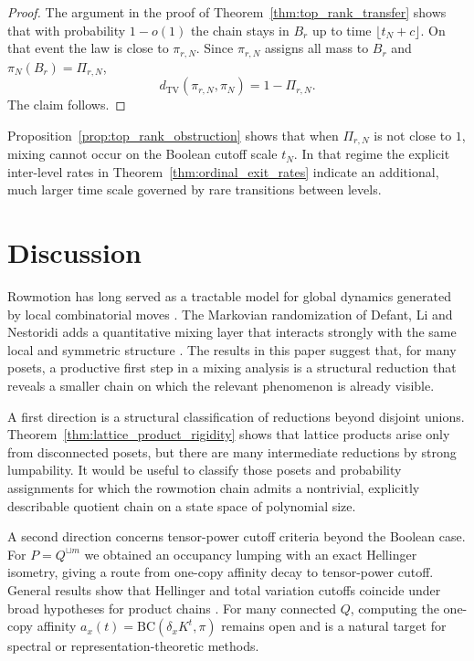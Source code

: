 \documentclass[final,3p,times]{elsarticle}
\theoremstyle{definition}
\newcommand{\TV}{d_{\mathrm{TV}}}
\newcommand{\BC}{\mathrm{BC}}
\begin{document}
\begin{proof}
The argument in the proof of Theorem~\ref{thm:top_rank_transfer} shows that with probability $1-o(1)$ the chain stays in $B_r$ up to time $\lfloor t_N+c\rfloor$.
On that event the law is close to $\pi_{r,N}$.
Since $\pi_{r,N}$ assigns all mass to $B_r$ and $\pi_N(B_r)=\Pi_{r,N}$,
\[
\TV(\pi_{r,N},\pi_N)=1-\Pi_{r,N}.
\]
The claim follows.
\end{proof}

Proposition~\ref{prop:top_rank_obstruction} shows that when $\Pi_{r,N}$ is not close to $1$, mixing cannot occur on the Boolean cutoff scale $t_N$.
In that regime the explicit inter-level rates in Theorem~\ref{thm:ordinal_exit_rates} indicate an additional, much larger time scale governed by rare transitions between levels.

\section{Discussion}

Rowmotion has long served as a tractable model for global dynamics generated by local combinatorial moves \cite{FonDerFlaass1993,StrikerWilliams2012,ThomasWilliams2019Slow}.
The Markovian randomization of Defant, Li and Nestoridi adds a quantitative mixing layer that interacts strongly with the same local and symmetric structure \cite{DefantLiNestoridi2024Rowmotion}.
The results in this paper suggest that, for many posets, a productive first step in a mixing analysis is a structural reduction that reveals a smaller chain on which the relevant phenomenon is already visible.

A first direction is a structural classification of reductions beyond disjoint unions.
Theorem~\ref{thm:lattice_product_rigidity} shows that lattice products arise only from disconnected posets, but there are many intermediate reductions by strong lumpability.
It would be useful to classify those posets and probability assignments for which the rowmotion chain admits a nontrivial, explicitly describable quotient chain on a state space of polynomial size.

A second direction concerns tensor-power cutoff criteria beyond the Boolean case.
For $P=Q^{\sqcup m}$ we obtained an occupancy lumping with an exact Hellinger isometry, giving a route from one-copy affinity decay to tensor-power cutoff.
General results show that Hellinger and total variation cutoffs coincide under broad hypotheses for product chains \cite{ChenKumagai2018ProductCutoff}.
For many connected $Q$, computing the one-copy affinity $a_x(t)=\BC(\delta_x K^t,\pi)$ remains open and is a natural target for spectral or representation-theoretic methods.
\end{document}
